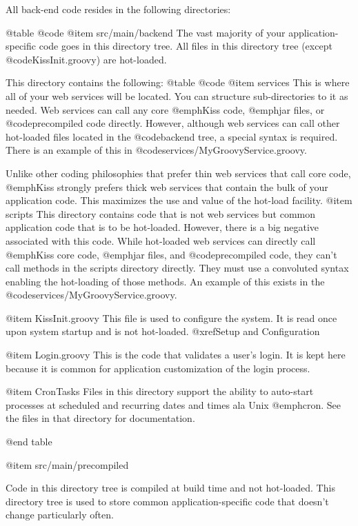 All back-end code resides in the following directories:


@table @code
@item src/main/backend
The vast majority of your application-specific code goes in this directory tree. 
All files in this directory tree (except @code{KissInit.groovy}) are hot-loaded. 

This directory contains the following:
@table @code
@item services
This is where all of your web services will be located.  You can structure sub-directories to it as needed.
Web services can call any core @emph{Kiss} code, @emph{jar} files, or @code{precompiled} code directly.
However, although web services can call other hot-loaded files located in the @code{backend} tree,
a special syntax is required.  There is an example of this in @code{services/MyGroovyService.groovy}.

Unlike other coding philosophies that prefer thin web services that
call core code, @emph{Kiss} strongly prefers thick web services that
contain the bulk of your application code.  This maximizes the use and
value of the hot-load facility.
@item scripts
This directory contains code that is not web services but common
application code that is to be hot-loaded.  However, there is a big
negative associated with this code.  While hot-loaded web services can
directly call @emph{Kiss} core code, @emph{jar} files, and
@code{precompiled} code, they can't call methods in the scripts
directory directly.  They must use a convoluted syntax enabling the
hot-loading of those methods. An example of this exists in the
@code{services/MyGroovyService.groovy}.


@item KissInit.groovy
This file is used to configure the system. It is read once upon system
startup and is not hot-loaded.  @xref{Setup and Configuration}

@item Login.groovy
This is the code that validates a user's login.  It is kept here because it is common for application 
customization of the login process.

@item CronTasks
Files in this directory support the ability to auto-start processes at
scheduled and recurring dates and times ala Unix @emph{cron}.  See the
files in that directory for documentation.


@end table

@item src/main/precompiled

Code in this directory tree is compiled at build time and not hot-loaded.  This directory tree is used to
store common application-specific code that doesn't change particularly often.

